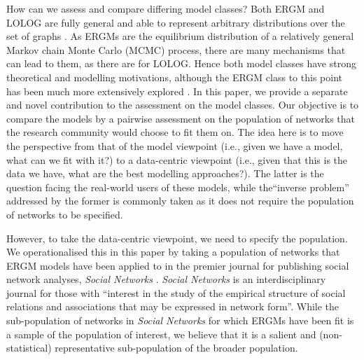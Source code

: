 \documentclass[
]{statsoc}
\begin{document}
How can we assess and compare differing model classes? Both ERGM and
LOLOG are fully general and able to represent arbitrary distributions
over the set of graphs \citep[][Theorem 1]{Fellows2018}. As ERGMs are
the equilibrium distribution of a relatively general Markov chain Monte
Carlo (MCMC) process, there are many mechanisms that can lead to them,
as there are for LOLOG. Hence both model classes have strong theoretical
and modelling motivations, although the ERGM class to this point has
been much more extensively explored
\citep{schweinberger2020,Schweinberger2017ExponentialFamilyMO}. In this
paper, we provide a separate and novel contribution to the assessment on
the model classes. Our objective is to compare the models by a pairwise
assessment on the population of networks that the research community
would choose to fit them on. The idea here is to move the perspective
from that of the model viewpoint (i.e., given we have a model, what can
we fit with it?) to a data-centric viewpoint (i.e., given that this is
the data we have, what are the best modelling approaches?). The latter
is the question facing the real-world users of these models, while
the``inverse problem'' addressed by the former is commonly taken as it
does not require the population of networks to be specified.

However, to take the data-centric viewpoint, we need to specify the
population. We operationalised this in this paper by taking a population
of networks that ERGM models have been applied to in the premier journal
for publishing social network analyses, \textit{Social Networks}
\citep{socialnetworks}. \textit{Social Networks} is an interdisciplinary
journal for those with ``interest in the study of the empirical
structure of social relations and associations that may be expressed in
network form''. While the sub-population of networks in
\textit{Social Networks} for which ERGMs have been fit is a sample of
the population of interest, we believe that it is a salient and
(non-statistical) representative sub-population of the broader
population.
\end{document}
